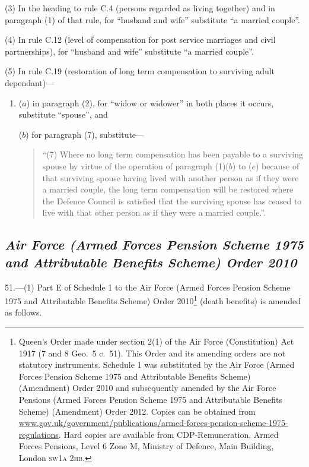 \documentclass[12pt,a4paper]{article}
\begin{document}
(3) In the heading to rule C.4 (persons regarded as living together) and in paragraph (1) of that rule, for “husband and wife” substitute “a married couple”.

(4) In rule C.12 (level of compensation for post service marriages and civil partnerships), for “husband and wife” substitute “a married couple”.

(5) In rule C.19 (restoration of long term compensation to surviving adult dependant)—
\begin{enumerate}\item[]
($a$) in paragraph (2), for “widow or widower” in both places it occurs, substitute “spouse”, and

($b$) for paragraph (7), substitute—
\begin{quotation}
“(7) Where no long term compensation has been payable to a surviving spouse by virtue of the operation of paragraph (1)($b$)  to ($e$)  because of that surviving spouse having lived with another person as if they were a married couple, the long term compensation will be restored where the Defence Council is satisfied that the surviving spouse has ceased to live with that other person as if they were a married couple.”.
\end{quotation}
\end{enumerate}

\subsection*{\itshape Air Force (Armed Forces Pension Scheme 1975 and Attributable Benefits Scheme) Order 2010}

51.—(1) Part E of Schedule 1 to the Air Force (Armed Forces Pension Scheme 1975 and Attributable Benefits Scheme) Order 2010\footnote{Queen’s Order made under section 2(1) of the Air Force (Constitution) Act 1917 (7 and 8 Geo.\ 5 c.~51). This Order and its amending orders are not statutory instruments. Schedule 1 was substituted by the Air Force (Armed Forces Pension Scheme 1975 and Attributable Benefits Scheme) (Amendment) Order 2010 and subsequently amended by the Air Force Pensions (Armed Forces Pension Scheme 1975 and Attributable Benefits Scheme) (Amendment) Order 2012. Copies can be obtained from \href{http://www.gov.uk/government/publications/armed-forces-pension-scheme-1975-regulations}{www.gov.uk/\hspace{0pt}government/\hspace{0pt}publications/\hspace{0pt}armed-forces-pension-scheme-1975-regulations}.  Hard copies are available from CDP-Remuneration, Armed Forces Pensions, Level 6 Zone M, Ministry of Defence, Main Building, London \textsc{\lowercase{SW1A 2HB}}.} (death benefits) is amended as follows.
\end{document}
